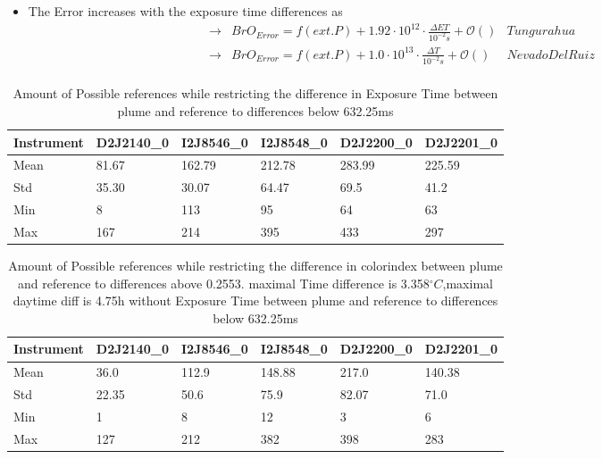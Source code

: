 \documentclass  [
  paper    = a4,
  BCOR     = 10mm,
  twoside,
  fontsize = 12pt,
  fleqn,
  toc      = bibnumbered,
  toc      = listofnumbered,
  numbers  = noendperiod,
  headings = normal,
  listof   = leveldown,
  version  = 3.03
]                                       {scrreprt}
\begin{document}
	\begin{itemize}
		\item The  Error increases with the exposure time differences as\\
		\begin{align*}
		\rightarrow&  BrO_{Error} = f(ext. P)+ 1.92\cdot10^{12}\cdot\frac{\Delta ET}{10^{-2}s} + \mathcal{O}\left(\right) & Tungurahua\\
		\rightarrow&  BrO_{Error} = f(ext. P)+ 1.0\cdot10^{13}\cdot\frac{\Delta T}{10^{-2}s} + \mathcal{O}\left(\right) & Nevado Del Ruiz\\
		\end{align*}
	\end{itemize}
	\begin{table}
	\begin{tabular}{|p{2cm}|p{2cm}|p{2cm}|p{2cm}|p{2cm}|p{2cm}|}
		Instrument	&D2J2140\_0&I2J8546\_0& I2J8548\_0&D2J2200\_0&D2J2201\_0\\
		\toprule
		Mean&81.67&162.79&212.78&283.99&225.59\\
		\midrule
		Std&
		35.30&
		30.07&
		64.47&
		69.5&
		41.2\\
		\midrule
		Min&8&113&95&64&63\\
		\midrule
		Max&167&214&395&433 &297\\
		\bottomrule
	\end{tabular}
	\caption{Amount of Possible references while restricting the difference in Exposure Time  between plume and reference to differences below 632.25ms}
\end{table}	

	\begin{table}
\begin{tabular}{|p{2cm}|p{2cm}|p{2cm}|p{2cm}|p{2cm}|p{2cm}|}
	Instrument	&D2J2140\_0&I2J8546\_0& I2J8548\_0&D2J2200\_0&D2J2201\_0\\
	\toprule
	Mean&36.0&112.9&148.88&217.0&140.38\\
	\midrule
	Std&
	22.35&
	50.6&
	75.9&
	82.07&
	71.0\\
	\midrule
	Min&1&8&12&3 &6\\
	\midrule
	Max&127&212&382&398 &283\\
	\bottomrule
\end{tabular}
\caption{Amount of Possible references while restricting the difference in colorindex  between plume and reference to differences above 0.2553. maximal Time difference is 3.358$^{\circ}C$,maximal daytime diff is 4.75h without Exposure Time  between plume and reference to differences below 632.25ms}
\end{table}	
\end{document}
